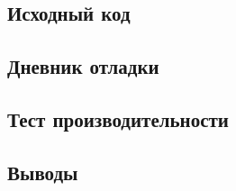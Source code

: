 \documentclass[12pt]{article}
\begin{document}
\subsection*{Исходный код}%
%
%
%
%
\subsection*{Дневник отладки}%

\subsection*{Тест производительности}%


\subsection*{Выводы}%
\end{document}
